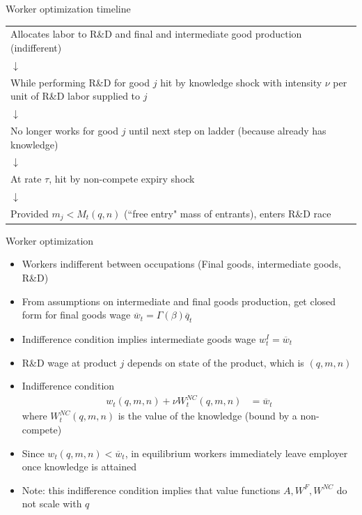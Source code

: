 \documentclass[english,usenames,dvipsnames]{beamer}
\begin{document}
\begin{frame}{Worker optimization timeline}
\begin{table}
	\begin{tabular}{p{}}
		\centering
		Allocates labor to R\&D and final and intermediate good production (indifferent) \\
		$\downarrow$\\
		While performing R\&D for good $j$ hit by knowledge shock with intensity $\nu$ per unit of R\&D labor supplied to $j$ \\
		$\downarrow$\\
		No longer works for good $j$ until next step on ladder (because already has knowledge) \\
		$\downarrow$\\
		At rate $\tau$, hit by non-compete expiry shock \\
		$\downarrow$\\
		Provided $m_j < M_t(q,n)$ (``free entry" mass of entrants), enters R\&D race 
	\end{tabular}
\end{table}
\end{frame}

\begin{frame}{Worker optimization}
\small
\begin{itemize}
	\item Workers indifferent between occupations (Final goods, intermediate goods, R\&D)
	\item From assumptions on intermediate and final goods production, get closed form for final goods wage  $\overline{w}_t = \Gamma(\beta) \overline{q}_t$
	\item Indifference condition implies intermediate goods wage $w^I_t = \overline{w}_t$ 
	\item R\&D wage at product $j$ depends on state of the product, which is $(q,m,n)$
	\item Indifference condition
	\begin{align*}
	w_t(q,m,n) + \nu W^{NC}_t(q,m,n) &= \overline{w}_t
	\end{align*}
	where $W^{NC}_t(q,m,n)$ is the value of the knowledge (bound by a non-compete)
	\item Since $w_t(q,m,n) < \overline{w}_t$, in equilibrium workers immediately leave employer once knowledge is attained 
	\item Note: this indifference condition implies that value functions $A,W^F,W^{NC}$ do not scale with $q$
\end{itemize}
\end{frame}
\end{document}
